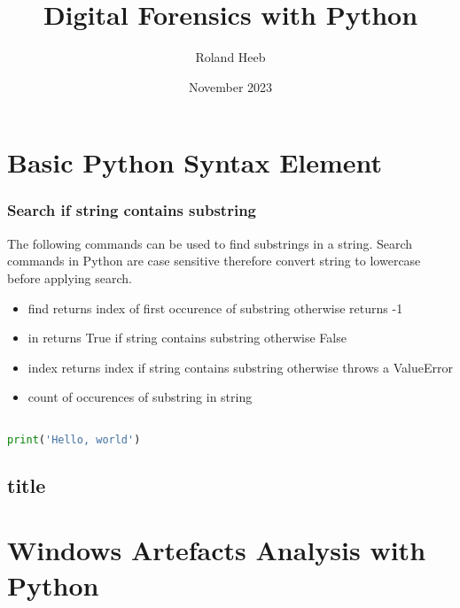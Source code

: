 \documentclass{article}
\title{Digital Forensics with Python}
\author{Roland Heeb}
\date{November 2023}
\begin{document}
\maketitle

\section{Basic Python Syntax Element}


\subsubsection{Search if string contains substring}

The following commands can be used to find substrings in a string. Search commands in Python are case sensitive
therefore convert string to lowercase before applying search.

\begin{itemize}
    \item find returns index of first occurence of substring otherwise returns -1
    \item in returns True if string contains substring otherwise False
    \item index returns index if string contains substring otherwise throws a ValueError
    \item count of occurences of substring in string
\end{itemize}

\begin{lstlisting}[language=Python]

print('Hello, world')

\end{lstlisting}



\subsection{title}


\section{Windows Artefacts Analysis with Python}


\end{document}
